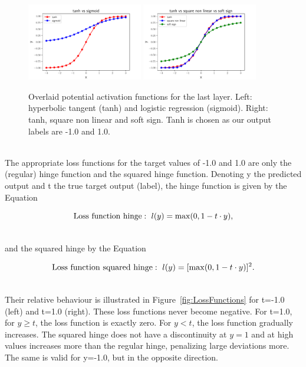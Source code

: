 \begin{figure}[htb]
\centering
\includegraphics[width=0.45\textwidth]{plots/ActivationFunctionsLastLayer1.pdf}
\includegraphics[width=0.45\textwidth]{plots/ActivationFunctionsLastLayer2.pdf}
\caption{Overlaid potential activation functions for the last layer. Left: hyperbolic tangent (tanh) and logistic regression (sigmoid). Right: tanh, square non linear and soft sign. Tanh is chosen as our output labels are -1.0 and 1.0.}
\label{fig:ActivationFunctionsLastLayer}
\end{figure}

\ \\The appropriate loss functions for the target values of -1.0 and 1.0 are only the (regular) hinge function and the squared hinge function. Denoting y the predicted output and t the true target output (label), the hinge function is given by the Equation

\begin{equation}
   \LossFunctionHinge:~l(y) =  \max(0, 1 - t \cdot y),
\end{equation}

\ \\and the squared hinge by the Equation

\begin{equation}
   \LossFunctionSquaredHinge:~l(y) = [\max(0, 1 - t \cdot y)]^2.
\end{equation}

\ \\Their relative behaviour is illustrated in Figure~\ref{fig:LossFunctions} for t=-1.0 (left) and t=1.0 (right). These loss functions never become negative. For t=1.0, for $y \ge t$, the loss function is exactly zero. For $y<t$, the loss function gradually increases. The squared hinge does not have a discontinuity at $y=1$ and at high values increases more than the regular hinge, penalizing large deviations more. The same is valid for y=-1.0, but in the opposite direction. 

